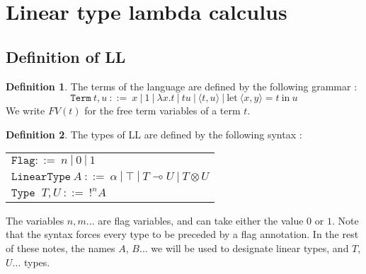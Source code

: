 \documentclass[10pt]{article}
\theoremstyle{plain}
\theoremstyle{definition}
\newtheorem{defn}{Definition}[subsection] %
\newcommand{\pair}[2]{\langle #1, #2 \rangle}
\begin{document}
\maketitle
\newpage

\tableofcontents
\newpage

\section{Linear type lambda calculus}

\subsection{Definition of LL}

\begin{defn} The terms of the language are defined by the following grammar :
	$$\texttt{Term} ~ t, u ~ ::= ~ x ~ | ~ 1 ~ | ~\lambda x.t ~ | ~ t u ~|~ \pair{t}{u} ~|~ \text{let} ~ \pair{x}{y} = t ~ \text{in} ~ u  $$
	We write $FV(t)$ for the free term variables of a term $t$.
\end{defn}

\begin{defn} The types of LL are defined by the following syntax :
	\begin{center}
	\begin{tabular}{l}
		$\texttt{Flag} ::= ~ n ~|~ 0 ~|~ 1$ \\		
		$\texttt{LinearType} ~ A ~ ::= ~ \alpha ~|~ \top ~|~ T \multimap U ~|~ T \otimes U$ \\
		$\texttt{Type	} ~	T, U ~ ::= ~ !^n A$
	\end{tabular}
	\end{center}
	The variables $n, m \dots$ are flag variables, and can take either the value $0$ or $1$.
	Note that the syntax forces every type to be preceded by a flag annotation.
	In the rest of these notes, the names $A$, $B \dots$ we will be used to designate linear types, and
	$T$, $U \dots$ types.
\end{defn}
\end{document}
